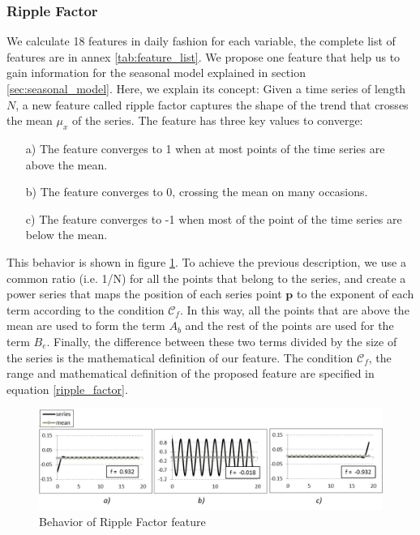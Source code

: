 \subsubsection{Ripple Factor}
\label{sec:ripple}

We calculate 18 features in daily fashion for each variable, the complete list of features are in annex \ref{tab:feature_list}. We propose one feature that help us to gain information for the seasonal model explained in section \ref{sec:seasonal_model}. Here, we explain its concept: Given a time series of length $N$, a new feature called ripple factor captures the shape of the trend that crosses the mean $\mu_x$ of the series. The feature has three key values to converge: 
\begin{itemize}
\item[a)] The feature converges to 1 when at most points of the time series are above the mean.
\item[b)] The feature converges to 0, crossing the mean on many occasions. 
\item[c)] The feature converges to -1 when most of the point of the time series are below the mean.
\end{itemize}

This behavior is shown in figure \ref{fig:rf_ex1}. To achieve the previous description, we use a common ratio (i.e. 1/N) for all the points that belong to the series, and create a power series that maps the position of each series point $\textbf{p}$ to the exponent of each term according to the condition $\mathscr{C}_f$. In this way, all the points that are above the mean are used to form the term $A_b$ and the rest of the points are used for the term $B_e$. Finally, the difference between these two terms divided by the size of the series is the mathematical definition of our feature. The condition $\mathscr{C}_f$, the range and mathematical definition of the proposed feature are specified in equation \ref{ripple_factor}.    

\begin{figure}[h!]
  \vspace{0.5em} %
  \includegraphics[scale=0.7]{Figures/Example_1_rf.jpg}
  \caption{Behavior of Ripple Factor feature}
  \label{fig:rf_ex1}
\end{figure}


